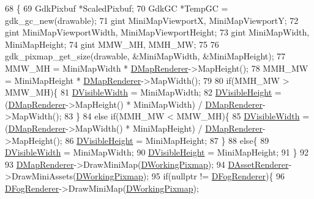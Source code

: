 \begin{DoxyCode}
68                                                        \{
69     GdkPixbuf *ScaledPixbuf;
70     GdkGC *TempGC = gdk\_gc\_new(drawable);
71     gint MiniMapViewportX, MiniMapViewportY;
72     gint MiniMapViewportWidth, MiniMapViewportHeight;
73     gint MiniMapWidth, MiniMapHeight;
74     gint MMW\_MH, MMH\_MW;
75     
76     gdk\_pixmap\_get\_size(drawable, &MiniMapWidth, &MiniMapHeight); 
77     MMW\_MH = MiniMapWidth * \hyperlink{classCMiniMapRenderer_a6656b208c6b29641a151ea4cbcfda31b}{DMapRenderer}->MapHeight();
78     MMH\_MW = MiniMapHeight * \hyperlink{classCMiniMapRenderer_a6656b208c6b29641a151ea4cbcfda31b}{DMapRenderer}->MapWidth();
79     
80     \textcolor{keywordflow}{if}(MMH\_MW > MMW\_MH)\{
81         \hyperlink{classCMiniMapRenderer_aedcb790a697e6f606cd7fa5089a41359}{DVisibleWidth} = MiniMapWidth;
82         \hyperlink{classCMiniMapRenderer_aad56353e51a1a3da66d3428cf0f1ccf8}{DVisibleHeight} = (\hyperlink{classCMiniMapRenderer_a6656b208c6b29641a151ea4cbcfda31b}{DMapRenderer}->MapHeight() * MiniMapWidth) / 
      \hyperlink{classCMiniMapRenderer_a6656b208c6b29641a151ea4cbcfda31b}{DMapRenderer}->MapWidth();        
83     \}
84     \textcolor{keywordflow}{else} \textcolor{keywordflow}{if}(MMH\_MW < MMW\_MH)\{
85         \hyperlink{classCMiniMapRenderer_aedcb790a697e6f606cd7fa5089a41359}{DVisibleWidth} = (\hyperlink{classCMiniMapRenderer_a6656b208c6b29641a151ea4cbcfda31b}{DMapRenderer}->MapWidth() * MiniMapHeight) / 
      \hyperlink{classCMiniMapRenderer_a6656b208c6b29641a151ea4cbcfda31b}{DMapRenderer}->MapHeight();
86         \hyperlink{classCMiniMapRenderer_aad56353e51a1a3da66d3428cf0f1ccf8}{DVisibleHeight} = MiniMapHeight;
87     \}
88     \textcolor{keywordflow}{else}\{
89         \hyperlink{classCMiniMapRenderer_aedcb790a697e6f606cd7fa5089a41359}{DVisibleWidth} = MiniMapWidth;
90         \hyperlink{classCMiniMapRenderer_aad56353e51a1a3da66d3428cf0f1ccf8}{DVisibleHeight} = MiniMapHeight;
91     \}
92     
93     \hyperlink{classCMiniMapRenderer_a6656b208c6b29641a151ea4cbcfda31b}{DMapRenderer}->DrawMiniMap(\hyperlink{classCMiniMapRenderer_a53bf622d2048ea136ae256e8d4b81fb5}{DWorkingPixmap});
94     \hyperlink{classCMiniMapRenderer_a352998f61c6777ccb3969712b8e691d9}{DAssetRenderer}->DrawMiniAssets(\hyperlink{classCMiniMapRenderer_a53bf622d2048ea136ae256e8d4b81fb5}{DWorkingPixmap});
95     \textcolor{keywordflow}{if}(\textcolor{keyword}{nullptr} != \hyperlink{classCMiniMapRenderer_a51a715ce4773d3fa3f433a282632035c}{DFogRenderer})\{
96         \hyperlink{classCMiniMapRenderer_a51a715ce4773d3fa3f433a282632035c}{DFogRenderer}->DrawMiniMap(\hyperlink{classCMiniMapRenderer_a53bf622d2048ea136ae256e8d4b81fb5}{DWorkingPixmap});

\end{DoxyCode}
